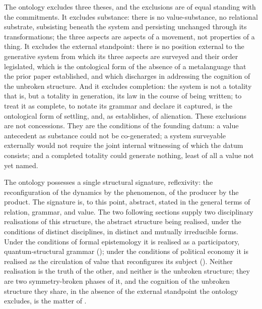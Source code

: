 The ontology excludes three theses, and the exclusions are of equal standing with the commitments. It excludes substance: there is no value-substance, no relational substrate, subsisting beneath the system and persisting unchanged through its transformations; the three aspects are aspects of a movement, not properties of a thing. It excludes the external standpoint: there is no position external to the generative system from which its three aspects are surveyed and their order legislated, which is the ontological form of the absence of a metalanguage that the prior paper established, and which  discharges in addressing the cognition of the unbroken structure. And it excludes completion: the system is not a totality that is, but a totality in generation, its law in the course of being written; to treat it as complete, to notate its grammar and declare it captured, is the ontological form of settling, and, as  establishes, of alienation. These exclusions are not concessions. They are the conditions of the founding datum: a value antecedent as substance could not be co-generated; a system surveyable externally would not require the joint internal witnessing of which the datum consists; and a completed totality could generate nothing, least of all a value not yet named.

The ontology possesses a single structural signature, reflexivity: the reconfiguration of the dynamics by the phenomenon, of the producer by the product. The signature is, to this point, abstract, stated in the general terms of relation, grammar, and value. The two following sections supply two disciplinary realisations of this structure, the abstract structure being realised, under the conditions of distinct disciplines, in distinct and mutually irreducible forms. Under the conditions of formal epistemology it is realised as a participatory, quantum-structural grammar (); under the conditions of political economy it is realised as the circulation of value that reconfigures its subject (). Neither realisation is the truth of the other, and neither is the unbroken structure; they are two symmetry-broken phases of it, and the cognition of the unbroken structure they share, in the absence of the external standpoint the ontology excludes, is the matter of .
